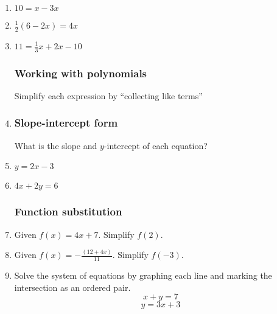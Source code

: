 \documentclass[12pt, twoside]{article}
\begin{document}
\begin{enumerate}
  \newpage

\item   $10=x-3x$ \vspace{3cm}
\item   $\frac{1}{2}(6-2x)=4x$ \vspace{3cm}
\item   $11=\frac{1}{3}x+2x-10$ \vspace{3cm}

\newpage
\subsubsection*{Working with polynomials}
Simplify each expression by ``collecting like terms''
\item 
\begin{enumerate}[itemsep=2cm]
  \end{enumerate} \vspace{1cm}

\subsubsection*{Slope-intercept form}

What is the slope and $y$-intercept of each equation?
\item   $y=2x-3$ \vspace{2cm}
\item   $4x+2y=6$ \vspace{3cm}


\subsubsection*{Function substitution}
\item Given $f(x)=4x+7$. Simplify $f(2)$. \vspace{4cm}
\item Given $\displaystyle f(x)=-\frac{(12+4x)}{11}$. Simplify $f(-3)$.


\newpage
  \item Solve the system of equations by graphing each line and marking the intersection as an ordered pair.
    \[x+y=7\]
    \[y=3x+3\]

\begin{center} %
\end{center}


\end{enumerate}
\end{document}

